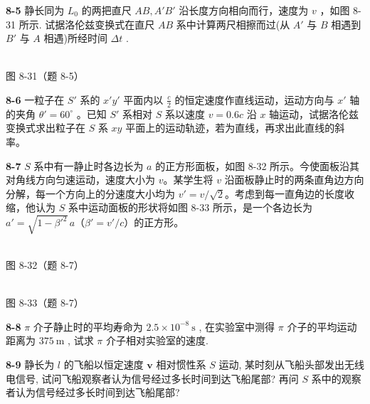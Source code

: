 \newpage

\textbf{8-5} 静长同为 $L_{0}$ 的两把直尺 $AB, A'B'$ 沿长度方向相向而行，速度为 $v$ ，如图 8-31 所示. 试据洛伦兹变换式在直尺 $AB$ 系中计算两尺相擦而过(从 $A'$ 与 $B$ 相遇到 $B'$ 与 $A$ 相遇)所经时间 $\Delta t$ .

\begin{center}
\resizebox{0.50\textwidth}{!}{}\\[4pt]
{\small 图 8-31（题 8-5）}
\end{center}

\newpage

\textbf{8-6} 一粒子在 $S'$ 系的 $x'y'$ 平面内以 $\frac{c}{2}$ 的恒定速度作直线运动，运动方向与 $x'$ 轴的夹角 $\theta' = 60^\circ$ 。已知 $S'$ 系相对 $S$ 系以速度 $v = 0.6c$ 沿 $x$ 轴运动，试据洛伦兹变换式求出粒子在 $S$ 系 $xy$ 平面上的运动轨迹，若为直线，再求出此直线的斜率。

\newpage

\textbf{8-7} $S$ 系中有一静止时各边长为 $a$ 的正方形面板，如图 8-32 所示。今使面板沿其对角线方向匀速运动，速度大小为 $v$。某学生将 $v$ 沿面板静止时的两条直角边方向分解，每一个方向上的分速度大小均为 $v'=v/\sqrt{2}$。考虑到每一直角边的长度收缩，他认为 $S$ 系中运动面板的形状将如图 8-33 所示，是一个各边长为 $a'=\sqrt{1-\beta'^2}\,a$（$\beta'=v'/c$）的正方形。

\begin{center}
\resizebox{0.38\textwidth}{!}{}\\[4pt]
{\small 图 8-32（题 8-7）}
\end{center}

\begin{center}
\resizebox{0.38\textwidth}{!}{}\\[4pt]
{\small 图 8-33（题 8-7）}
\end{center}

\newpage

\textbf{8-8} $\pi$ 介子静止时的平均寿命为 $2.5 \times 10^{-8} \mathrm{~s}$ , 在实验室中测得 $\pi$ 介子的平均运动距离为 $375 \mathrm{~m}$ , 试求 $\pi$ 介子相对实验室的速度.

\newpage

\textbf{8-9} 静长为 $l$ 的飞船以恒定速度 $\pmb{v}$ 相对惯性系 $S$ 运动, 某时刻从飞船头部发出无线电信号, 试问飞船观察者认为信号经过多长时间到达飞船尾部? 再问 $S$ 系中的观察者认为信号经过多长时间到达飞船尾部?

